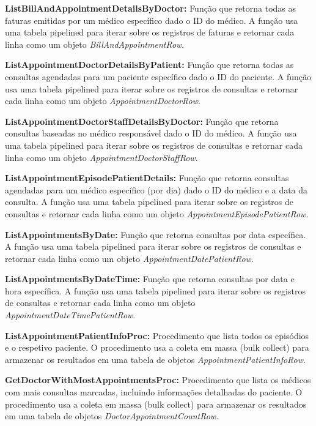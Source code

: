 \vspace{0.15cm}
\textbf{ListBillAndAppointmentDetailsByDoctor:} Função que retorna todas as faturas emitidas por um médico específico dado o ID do médico. A função usa uma tabela pipelined para iterar sobre os registros de faturas e retornar cada linha como um objeto \textit{BillAndAppointmentRow}.

\vspace{0.15cm}
\textbf{ListAppointmentDoctorDetailsByPatient:} Função que retorna todas as consultas agendadas para um paciente específico dado o ID do paciente. A função usa uma tabela pipelined para iterar sobre os registros de consultas e retornar cada linha como um objeto \textit{AppointmentDoctorRow}.

\vspace{0.15cm}
\textbf{ListAppointmentDoctorStaffDetailsByDoctor:} Função que retorna consultas baseadas no médico responsável dado o ID do médico. A função usa uma tabela pipelined para iterar sobre os registros de consultas e retornar cada linha como um objeto \textit{AppointmentDoctorStaffRow}.

\vspace{0.15cm}
\textbf{ListAppointmentEpisodePatientDetails:} Função que retorna consultas agendadas para um médico específico (por dia) dado o ID do médico e a data da consulta. A função usa uma tabela pipelined para iterar sobre os registros de consultas e retornar cada linha como um objeto \textit{AppointmentEpisodePatientRow}.

\vspace{0.15cm}
\textbf{ListAppointmentsByDate:} Função que retorna consultas por data específica. A função usa uma tabela pipelined para iterar sobre os registros de consultas e retornar cada linha como um objeto \textit{AppointmentDatePatientRow}.

\vspace{0.15cm}
\textbf{ListAppointmentsByDateTime:} Função que retorna consultas por data e hora específica. A função usa uma tabela pipelined para iterar sobre os registros de consultas e retornar cada linha como um objeto \textit{AppointmentDateTimePatientRow}.

\vspace{0.15cm}
\textbf{ListAppointmentPatientInfoProc:} Procedimento que lista todos os episódios e o respetivo paciente. O procedimento usa a coleta em massa (bulk collect) para armazenar os resultados em uma tabela de objetos \textit{AppointmentPatientInfoRow}.

\vspace{0.15cm}
\textbf{GetDoctorWithMostAppointmentsProc:} Procedimento que lista os médicos com mais consultas marcadas, incluindo informações detalhadas do paciente. O procedimento usa a coleta em massa (bulk collect) para armazenar os resultados em uma tabela de objetos \textit{DoctorAppointmentCountRow}.